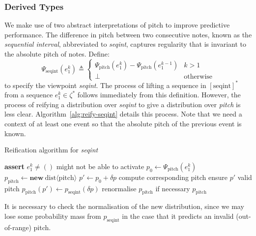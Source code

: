 \documentclass[12pt,a4paper,twoside,openright]{report}
\begin{document}
\subsubsection{Derived Types}

We make use of two abstract interpretations of pitch to improve predictive
performance. The difference in pitch between two consecutive notes, known as the
\emph{sequential interval}, abbreviated to \emph{seqint}, captures regularity
that is invariant to the absolute pitch of notes. Define:
$$ \Psi_{\mathrm{seqint}}(e_1^k) \triangleq \begin{cases}
  \Psi_{\mathrm{pitch}}(e_1^k) - \Psi_{\mathrm{pitch}}(e_1^{k-1}) & k > 1 \\
  \bot & \text{otherwise} 
\end{cases}
$$
to specify the viewpoint \emph{seqint}. The process of lifting a sequence in
$[\mathrm{seqint}]^*$ from a sequence $e_1^k \in \zeta^*$ follows immediately
from this definition. However, the process of reifying a distribution over
\emph{seqint} to give a distribution over \emph{pitch} is less clear.
Algorithm~\ref{alg:reify-seqint} details this process. Note that we need a
context of at least one event so that the absolute pitch of the previous event
is known.

\begin{algorithm}[H]
  \caption{Reification algorithm for \emph{seqint}}
  \label{alg:reify-seqint}
  \begin{algorithmic}[1]
      \State \textbf{assert} $e_1^k \neq ()$
      \Comment might not be able to activate
      \State $p_0 \gets \Psi_{\mathrm{pitch}}(e_1^k)$
      \State $p_{\mathrm{pitch}} \gets \textbf{new}\
      \mathrm{dist}\langle\mathrm{pitch}\rangle$
        \State $p' \gets p_0 + \delta p$
        \Comment compute corresponding pitch
          \Comment ensure $p'$ valid pitch
          \State $p_{\mathrm{pitch}}(p') \gets p_{\mathrm{seqint}}(\delta p)$
        \EndIf
      \EndFor
      \State renormalise $p_{\mathrm{pitch}}$ if necessary
      \State \Return $p_{\mathrm{pitch}}$
    \EndFunction
  \end{algorithmic}
\end{algorithm}

It is necessary to check the normalisation of the new distribution, since we may
lose some probability mass from $p_{\mathrm{seqint}}$ in the case that it
predicts an invalid (out-of-range) pitch.
\end{document}
